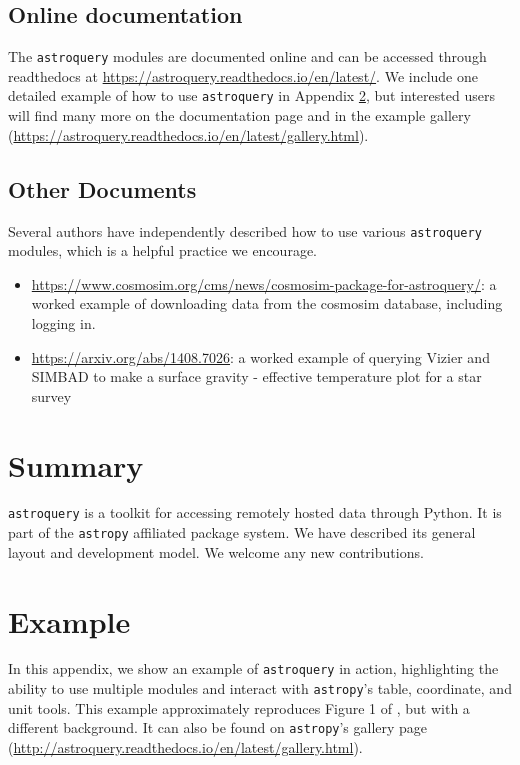\documentclass[twocolumn]{aastex61}
\newcommand{\package}[1]{\texttt{#1}\xspace}
\newcommand{\astroquery}{\package{astroquery}}
\newcommand{\astropypkg}{\package{astropy}}
\begin{document}
\subsection{Online documentation}
The \astroquery modules are documented online and can be accessed through
readthedocs at \url{https://astroquery.readthedocs.io/en/latest/}.
We include one detailed example of how to use \astroquery in Appendix \ref{sec:example},
but interested users will find many more on the documentation page and
in the example gallery (\url{https://astroquery.readthedocs.io/en/latest/gallery.html}).

\subsection{Other Documents}
Several authors have independently described how to use various \astroquery
modules, which is a helpful practice we encourage.

\begin{itemize}
    \item
        \url{https://www.cosmosim.org/cms/news/cosmosim-package-for-astroquery/}:
        a worked example of downloading data from the cosmosim database,
        including logging in.
    \item \url{https://arxiv.org/abs/1408.7026}: a worked example of querying
        Vizier and SIMBAD to make a surface gravity - effective temperature
        plot for a star survey
\end{itemize}

\section{Summary}
\astroquery is a toolkit for accessing remotely hosted data through Python.
It is part of the \astropypkg affiliated package system.
We have described its general layout and development model.
We welcome any new contributions.





\appendix
\section{Example}
\label{sec:example}
In this appendix, we show an example of \astroquery in action, highlighting the
ability to use multiple modules and interact with \astropypkg's table, coordinate,
and unit tools.  This example approximately reproduces Figure 1 of
\citet{Eisner2016a}, but with a different background.
It can also be found on \astropypkg's gallery page (\url{http://astroquery.readthedocs.io/en/latest/gallery.html}).
\end{document}
